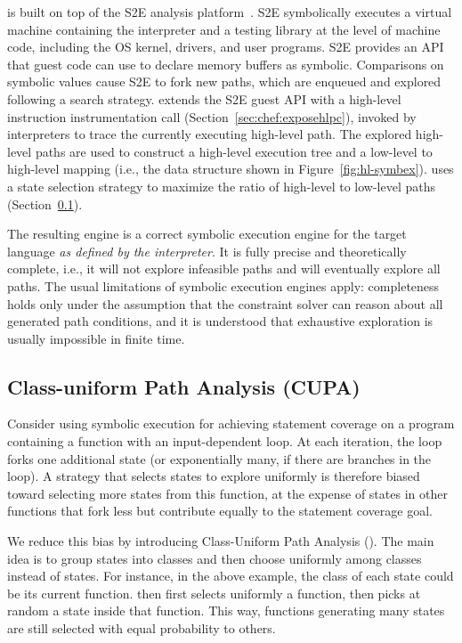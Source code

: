 \chef is built on top of the S2E analysis platform~\cite{s2eSystem}. S2E symbolically executes a virtual machine containing the interpreter and a testing library at the level of machine code,  including the OS kernel, drivers, and user programs.  S2E provides an API that guest code can use to declare memory buffers as symbolic. Comparisons on symbolic values cause S2E to fork new paths, which are enqueued and explored following a search strategy.
%
\chef extends the S2E guest API with a high-level instruction instrumentation call (Section~\ref{sec:chef:exposehlpc}), invoked by interpreters to trace the currently executing high-level path.  The explored high-level paths are used to construct a high-level execution tree and a low-level to high-level mapping (i.e., the data structure shown in Figure~\ref{fig:hl-symbex}).  \chef uses a state selection strategy to maximize the ratio of high-level to low-level paths (Section~\ref{sec:chef:cupa}).

The resulting engine is a correct symbolic execution engine for the target language \textit{as defined by the interpreter}. It is fully precise and theoretically complete, i.e., it will not explore infeasible paths and will eventually explore all paths. The usual limitations of symbolic execution engines apply: completeness holds only under the assumption that the constraint solver can reason about all generated path conditions, and it is understood that exhaustive exploration is usually impossible in finite time.

\subsection{Class-uniform Path Analysis (CUPA)}
\label{sec:chef:cupa}

Consider using symbolic execution for achieving statement coverage on a program containing a function with an input-dependent loop.  At each iteration, the loop forks one additional state (or exponentially many, if there are branches in the loop). A strategy that selects states to explore uniformly is therefore biased toward selecting more states from this function, at the expense of states in other functions that fork less but contribute equally to the statement coverage goal.

We reduce this bias by introducing Class-Uniform Path Analysis (\cupa).
%
The main idea is to group states into classes and then choose uniformly among classes instead of states.  For instance, in the above example, the class of each state could be its current function.  \cupa then first selects uniformly a function, then picks at random a state inside that function.  This way, functions generating many states are still selected with equal probability to others.

